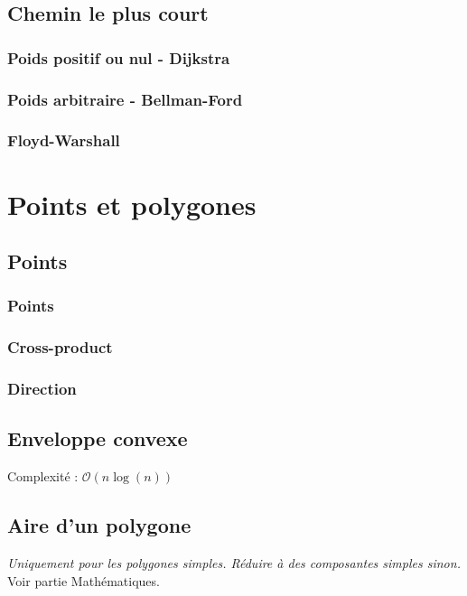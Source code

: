 \documentclass[8pt]{article}
\begin{document}
        \subsection{Chemin le plus court}
            \subsubsection{Poids positif ou nul - Dijkstra}
            {\scriptsize}
            \subsubsection{Poids arbitraire - Bellman-Ford}
            {\scriptsize}
            \subsubsection{Floyd-Warshall}
            {\scriptsize}
    \section{Points et polygones}
        \subsection{Points}
            \subsubsection{Points}
            {\scriptsize}
            \subsubsection{Cross-product}
            {\scriptsize}
            \subsubsection{Direction}
            {\scriptsize}
        \subsection{Enveloppe convexe}
            Complexité : $\mathcal{O}(n \log(n))$
            {\scriptsize}
        \subsection{Aire d'un polygone}
        \textit{Uniquement pour les polygones simples. Réduire à des composantes simples sinon.}
        Voir partie Mathématiques.
        {\scriptsize}
\end{document}
